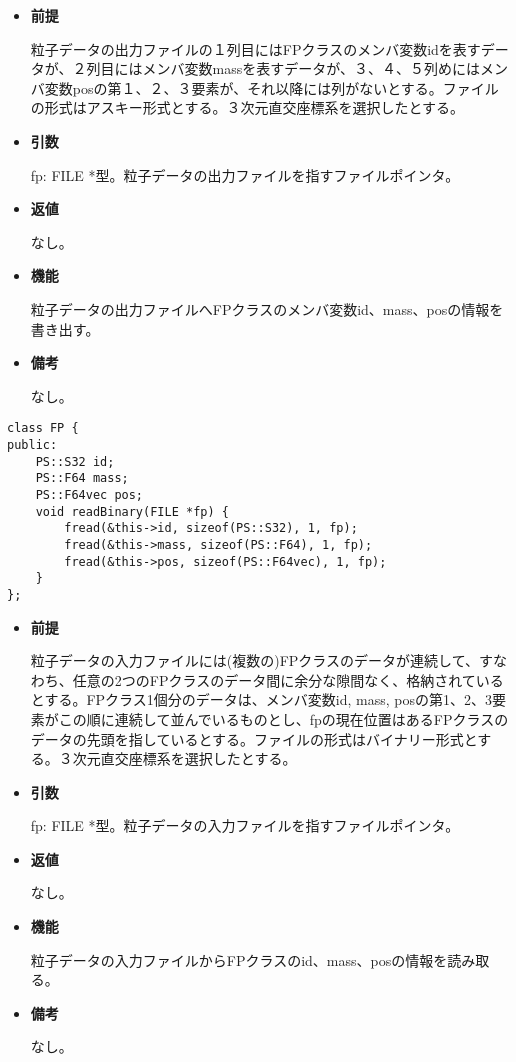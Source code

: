 \begin{itemize}

\item {\bf 前提}

  粒子データの出力ファイルの１列目にはFPクラスのメンバ変数idを表すデー
  タが、２列目にはメンバ変数massを表すデータが、３、４、５列めにはメン
  バ変数posの第１、２、３要素が、それ以降には列がないとする。ファイル
  の形式はアスキー形式とする。３次元直交座標系を選択したとする。

\item {\bf 引数}

  fp: FILE *型。粒子データの出力ファイルを指すファイルポインタ。
  
\item {\bf 返値}

  なし。
  
\item {\bf 機能}

  粒子データの出力ファイルへFPクラスのメンバ変数id、mass、posの情報を
  書き出す。
  
\item {\bf 備考}

  なし。
  
\end{itemize}


\begin{screen}
\begin{verbatim}
class FP {
public:
    PS::S32 id;
    PS::F64 mass;
    PS::F64vec pos;
    void readBinary(FILE *fp) {
        fread(&this->id, sizeof(PS::S32), 1, fp);
        fread(&this->mass, sizeof(PS::F64), 1, fp);
        fread(&this->pos, sizeof(PS::F64vec), 1, fp);
    }
};
\end{verbatim}
\end{screen}

\begin{itemize}

\item {\bf 前提}

  粒子データの入力ファイルには(複数の)FPクラスのデータが連続して、すなわち、任意の2つのFPクラスのデータ間に余分な隙間なく、格納されているとする。FPクラス1個分のデータは、メンバ変数id, mass, posの第1、2、3要素がこの順に連続して並んでいるものとし、fpの現在位置はあるFPクラスのデータの先頭を指しているとする。ファイルの形式はバイナリー形式とする。３次元直交座標系を選択したとする。

\item {\bf 引数}

  fp: FILE *型。粒子データの入力ファイルを指すファイルポインタ。
  
\item {\bf 返値}

  なし。
  
\item {\bf 機能}

  粒子データの入力ファイルからFPクラスのid、mass、posの情報を読み取る。
  
\item {\bf 備考}

  なし。
  
\end{itemize}

